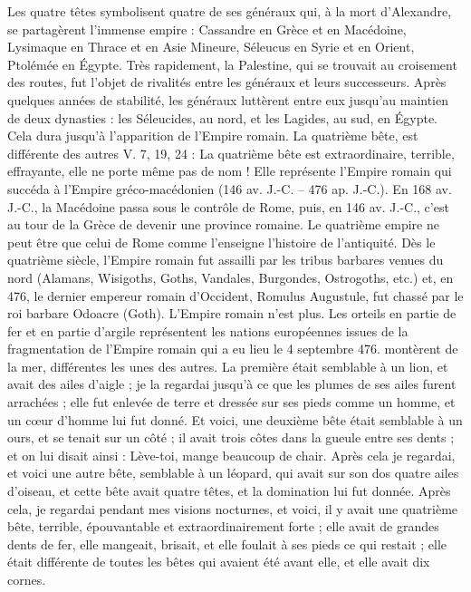 \begin{multicols}{2}
{Les quatre têtes symbolisent quatre de ses généraux qui, à la mort d’Alexandre, se partagèrent l’immense empire : Cassandre en Grèce et en Macédoine, Lysimaque en Thrace et en Asie Mineure, Séleucus en Syrie et en Orient, Ptolémée en Égypte.
Très rapidement, la Palestine, qui se trouvait au croisement des routes, fut l’objet de rivalités entre les généraux et leurs successeurs. Après quelques années de stabilité, les généraux luttèrent entre eux jusqu’au maintien de deux dynasties : les Séleucides, au nord, et les Lagides, au sud, en Égypte. Cela dura jusqu'à l’apparition de l’Empire romain.
La quatrième bête, est différente des autres
V. 7, 19, 24 : La quatrième bête est extraordinaire, terrible, effrayante, elle ne porte même pas de nom ! Elle représente l’Empire romain qui succéda à l’Empire gréco-macédonien (146 av. J.-C. – 476 ap. J.-C.). En 168 av. J.-C., la Macédoine passa sous le contrôle de Rome, puis, en 146 av. J.-C., c'est au tour de la Grèce de devenir une  province romaine.
 Le quatrième empire ne peut être que celui de Rome comme l'enseigne l'histoire de l'antiquité. 
Dès le quatrième siècle, l'Empire romain fut assailli par les tribus barbares venues du nord (Alamans, Wisigoths, Goths, Vandales, Burgondes, Ostrogoths, etc.) et, en 476, le dernier empereur romain d'Occident, Romulus Augustule, fut chassé par le roi barbare Odoacre (Goth). L'Empire romain n'est plus.
Les orteils en partie de fer et en partie d'argile représentent les nations européennes issues de la fragmentation de l'Empire romain qui a eu lieu le 4 septembre 476.} montèrent de la mer, différentes les unes des autres.
La première était semblable à un lion, et avait des ailes d'aigle ; je la regardai jusqu'à ce que les plumes de ses ailes furent arrachées ; elle fut enlevée de terre et dressée sur ses pieds comme un homme, et un cœur d'homme lui fut donné.
Et voici, une deuxième bête  était semblable à un ours, et se tenait sur un côté ;  il avait trois côtes dans la gueule entre ses dents ; et on lui disait ainsi : Lève-toi, mange beaucoup de chair.
Après cela je regardai, et voici une autre bête, semblable à un léopard, qui avait sur son dos quatre ailes d'oiseau, et cette bête avait quatre têtes, et la domination lui fut donnée.
Après cela, je regardai pendant mes visions nocturnes, et voici, il y avait une quatrième bête, terrible, épouvantable et extraordinairement forte ; elle avait de grandes dents de fer, elle mangeait, brisait, et elle foulait à ses pieds ce qui restait ;  elle était différente de toutes les bêtes qui avaient été avant elle, et elle avait dix cornes.

\end{multicols}
